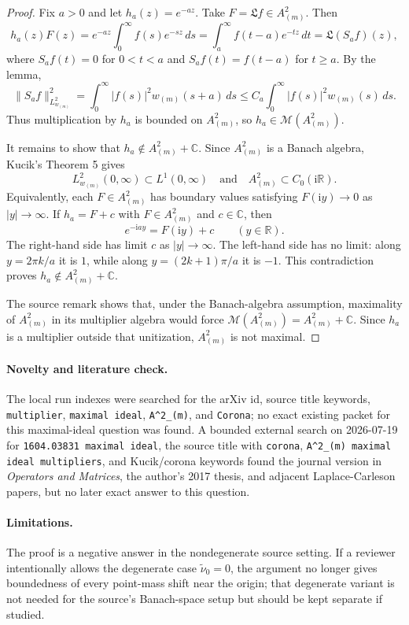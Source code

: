 \documentclass[11pt]{article}
\newcommand{\C}{\mathbb C}
\newcommand{\R}{\mathbb R}
\newcommand{\M}{\mathscr M}
\newcommand{\LL}{\mathfrak L}
\newcommand{\ii}{\mathrm i}
\begin{document}
\begin{proof}
Fix \(a>0\) and let \(h_a(z)=e^{-az}\).  Take
\(F=\LL f\in A^2_{(m)}\).  Then
\[
  h_a(z)F(z)
  =e^{-az}\int_0^\infty f(s)e^{-sz}\,ds
  =\int_a^\infty f(t-a)e^{-tz}\,dt
  =\LL(S_af)(z),
\]
where \(S_af(t)=0\) for \(0<t<a\) and \(S_af(t)=f(t-a)\) for \(t\ge a\).
By the lemma,
\[
  \|S_af\|_{L^2_{w_{(m)}}}^2
  =\int_0^\infty |f(s)|^2w_{(m)}(s+a)\,ds
  \le C_a\int_0^\infty |f(s)|^2w_{(m)}(s)\,ds.
\]
Thus multiplication by \(h_a\) is bounded on \(A^2_{(m)}\), so
\(h_a\in\M(A^2_{(m)})\).

It remains to show that \(h_a\notin A^2_{(m)}+\C\).  Since \(A^2_{(m)}\) is a
Banach algebra, Kucik's Theorem 5 gives
\[
  L^2_{w_{(m)}}(0,\infty)\subset L^1(0,\infty)
  \quad\text{and}\quad
  A^2_{(m)}\subset C_0(\ii\R).
\]
Equivalently, each \(F\in A^2_{(m)}\) has boundary values satisfying
\(F(\ii y)\to0\) as \(|y|\to\infty\).  If \(h_a=F+c\) with
\(F\in A^2_{(m)}\) and \(c\in\C\), then
\[
  e^{-\ii ay}=F(\ii y)+c\qquad(y\in\R).
\]
The right-hand side has limit \(c\) as \(|y|\to\infty\).  The left-hand side
has no limit: along \(y=2\pi k/a\) it is \(1\), while along
\(y=(2k+1)\pi/a\) it is \(-1\).  This contradiction proves
\(h_a\notin A^2_{(m)}+\C\).

The source remark shows that, under the Banach-algebra assumption,
maximality of \(A^2_{(m)}\) in its multiplier algebra would force
\(\M(A^2_{(m)})=A^2_{(m)}+\C\).  Since \(h_a\) is a multiplier outside that
unitization, \(A^2_{(m)}\) is not maximal.
\end{proof}

\paragraph{Novelty and literature check.}
The local run indexes were searched for the arXiv id, source title keywords,
\texttt{multiplier}, \texttt{maximal ideal}, \texttt{A\^{}2\_(m)}, and
\texttt{Corona}; no exact existing packet for this maximal-ideal question was
found.  A bounded external search on 2026-07-19 for \texttt{1604.03831
maximal ideal}, the source title with \texttt{corona}, \texttt{A\^{}2\_(m)
maximal ideal multipliers}, and Kucik/corona keywords found the journal
version in \emph{Operators and Matrices}, the author's 2017 thesis, and
adjacent Laplace-Carleson papers, but no later exact answer to this question.

\paragraph{Limitations.}
The proof is a negative answer in the nondegenerate source setting.  If a
reviewer intentionally allows the degenerate case \(\widetilde\nu_0=0\), the
argument no longer gives boundedness of every point-mass shift near the
origin; that degenerate variant is not needed for the source's Banach-space
setup but should be kept separate if studied.
\end{document}
